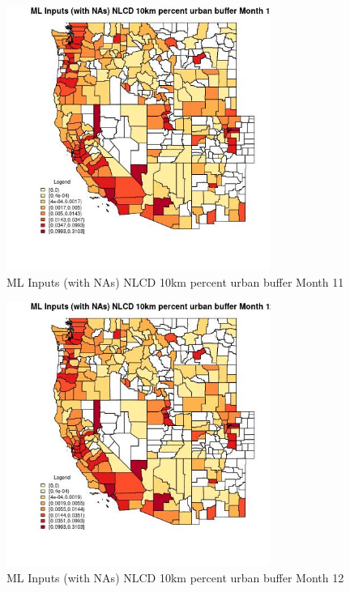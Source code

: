 \begin{figure} 
\centering  
\includegraphics[width=0.77\textwidth]{Code_Outputs/Report_ML_input_PM25_Step4_part_e_de_duplicated_aves_compiled_2019-05-21wNAs_CountyNLCD_10km_percent_urban_buffermedianMonth11.jpg} 
\caption{\label{fig:Report_ML_input_PM25_Step4_part_e_de_duplicated_aves_compiled_2019-05-21wNAsCountyNLCD_10km_percent_urban_buffermedianMonth11}ML Inputs (with NAs) NLCD 10km percent urban buffer Month 11} 
\end{figure} 
 

\begin{figure} 
\centering  
\includegraphics[width=0.77\textwidth]{Code_Outputs/Report_ML_input_PM25_Step4_part_e_de_duplicated_aves_compiled_2019-05-21wNAs_CountyNLCD_10km_percent_urban_buffermedianMonth12.jpg} 
\caption{\label{fig:Report_ML_input_PM25_Step4_part_e_de_duplicated_aves_compiled_2019-05-21wNAsCountyNLCD_10km_percent_urban_buffermedianMonth12}ML Inputs (with NAs) NLCD 10km percent urban buffer Month 12} 
\end{figure} 
 

